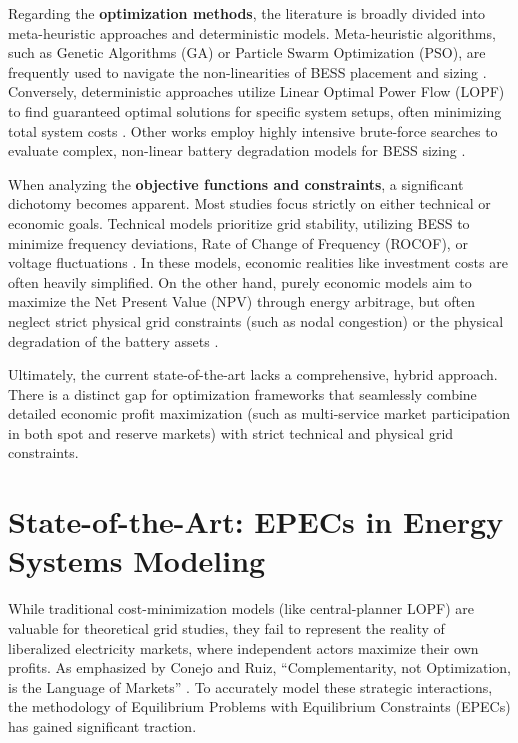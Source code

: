 Regarding the \textbf{optimization methods}, the literature is broadly divided into meta-heuristic approaches and deterministic models. Meta-heuristic algorithms, such as Genetic Algorithms (GA) or Particle Swarm Optimization (PSO), are frequently used to navigate the non-linearities of BESS placement and sizing \cite{das_optimal_2020}. Conversely, deterministic approaches utilize Linear Optimal Power Flow (LOPF) to find guaranteed optimal solutions for specific system setups, often minimizing total system costs \cite{czock_place_2023}. Other works employ highly intensive brute-force searches to evaluate complex, non-linear battery degradation models for BESS sizing \cite{shin_optimal_2020}.

When analyzing the \textbf{objective functions and constraints}, a significant dichotomy becomes apparent. Most studies focus strictly on either technical or economic goals. Technical models prioritize grid stability, utilizing BESS to minimize frequency deviations, Rate of Change of Frequency (ROCOF), or voltage fluctuations \cite{das_optimal_2020, alonso_sorensen_energy_2023}. In these models, economic realities like investment costs are often heavily simplified. On the other hand, purely economic models aim to maximize the Net Present Value (NPV) through energy arbitrage, but often neglect strict physical grid constraints (such as nodal congestion) or the physical degradation of the battery assets \cite{shin_optimal_2020}. 

Ultimately, the current state-of-the-art lacks a comprehensive, hybrid approach. There is a distinct gap for optimization frameworks that seamlessly combine detailed economic profit maximization (such as multi-service market participation in both spot and reserve markets) with strict technical and physical grid constraints.

\section{State-of-the-Art: EPECs in Energy Systems Modeling} \label{sec:soa_epec}
While traditional cost-minimization models (like central-planner LOPF) are valuable for theoretical grid studies, they fail to represent the reality of liberalized electricity markets, where independent actors maximize their own profits. As emphasized by Conejo and Ruiz, ``Complementarity, not Optimization, is the Language of Markets'' \cite{conejo_complementarity_2020}. To accurately model these strategic interactions, the methodology of Equilibrium Problems with Equilibrium Constraints (EPECs) has gained significant traction.

